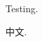 \documentclass[12pt]{article}
\begin{document}
 


Testing.

中文.
                                
\end{document}
